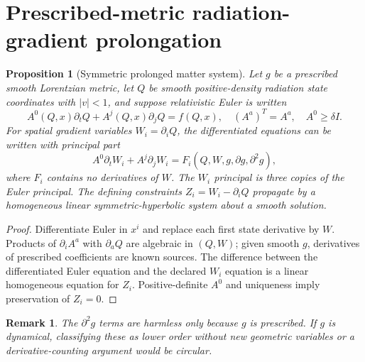 \documentclass[11pt,a4paper]{article}
\newtheorem{proposition}[theorem]{Proposition}
\newtheorem{remark}[theorem]{Remark}
\begin{document}
\section{Prescribed-metric radiation-gradient prolongation}
\begin{proposition}[Symmetric prolonged matter system]\label{prop:prolong}
Let $g$ be a prescribed smooth Lorentzian metric, let $Q$ be smooth positive-density radiation state coordinates with $|v|<1$, and suppose relativistic Euler is written
\[A^0(Q,x)\partial_t Q+A^j(Q,x)\partial_jQ=f(Q,x),\quad
(A^a)^T=A^a,\quad A^0\ge\delta I.\]
For spatial gradient variables $W_i=\partial_iQ$, the differentiated equations can be written with principal part
\[A^0\partial_tW_i+A^j\partial_jW_i=F_i(Q,W,g,\partial g,\partial^2g),\]
where $F_i$ contains no derivatives of $W$. The $W_i$ principal is three copies of the Euler principal. The defining constraints $Z_i=W_i-\partial_iQ$ propagate by a homogeneous linear symmetric-hyperbolic system about a smooth solution.
\end{proposition}
\begin{proof}Differentiate Euler in $x^i$ and replace each first state derivative by $W$. Products of $\partial_iA^a$ with $\partial_aQ$ are algebraic in $(Q,W)$; given smooth $g$, derivatives of prescribed coefficients are known sources. The difference between the differentiated Euler equation and the declared $W_i$ equation is a linear homogeneous equation for $Z_i$. Positive-definite $A^0$ and uniqueness imply preservation of $Z_i=0$.\end{proof}
\begin{remark}The $\partial^2g$ terms are harmless only because $g$ is prescribed. If $g$ is dynamical, classifying these as lower order without new geometric variables or a derivative-counting argument would be circular.\end{remark}
\end{document}
